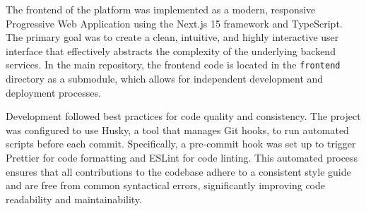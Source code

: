 The frontend of the platform was implemented as a modern, responsive Progressive Web Application using the Next.js 15 framework and TypeScript. The primary goal was to create a clean, intuitive, and highly interactive user interface that effectively abstracts the complexity of the underlying backend services. In the main repository, the frontend code is located in the \texttt{frontend} directory as a submodule, which allows for independent development and deployment processes.

Development followed best practices for code quality and consistency. The project was configured to use Husky, a tool that manages Git hooks, to run automated scripts before each commit. Specifically, a pre-commit hook was set up to trigger Prettier for code formatting and ESLint for code linting. This automated process ensures that all contributions to the codebase adhere to a consistent style guide and are free from common syntactical errors, significantly improving code readability and maintainability.